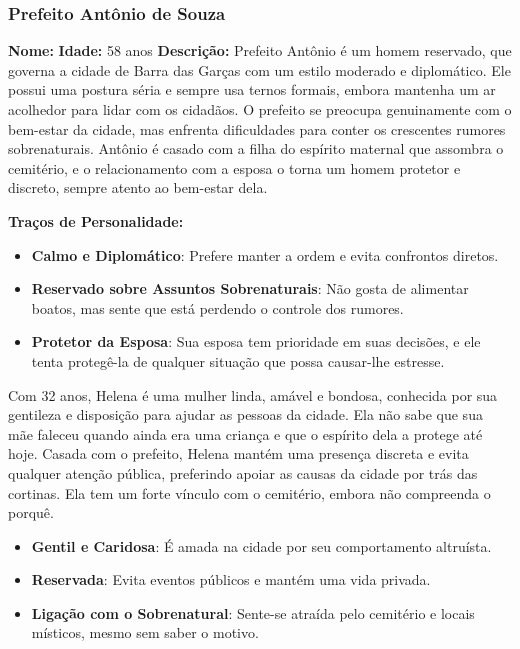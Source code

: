 \begin{personagem}
\subsubsection{Prefeito Antônio de Souza}
\textbf{Nome:} 
\textbf{Idade:} 58 anos  
\textbf{Descrição:}  
Prefeito Antônio é um homem reservado, que governa a cidade de Barra das Garças com um estilo moderado e diplomático. Ele possui uma postura séria e sempre usa ternos formais, embora mantenha um ar acolhedor para lidar com os cidadãos. O prefeito se preocupa genuinamente com o bem-estar da cidade, mas enfrenta dificuldades para conter os crescentes rumores sobrenaturais. Antônio é casado com a filha do espírito maternal que assombra o cemitério, e o relacionamento com a esposa o torna um homem protetor e discreto, sempre atento ao bem-estar dela.

\textbf{Traços de Personalidade:}
\begin{itemize}
    \item \textbf{Calmo e Diplomático}: Prefere manter a ordem e evita confrontos diretos.
    \item \textbf{Reservado sobre Assuntos Sobrenaturais}: Não gosta de alimentar boatos, mas sente que está perdendo o controle dos rumores.
    \item \textbf{Protetor da Esposa}: Sua esposa tem prioridade em suas decisões, e ele tenta protegê-la de qualquer situação que possa causar-lhe estresse.
\end{itemize}
\end{personagem}


{Com 32 anos, Helena é uma mulher linda, amável e bondosa, conhecida por sua gentileza e disposição para ajudar as pessoas da cidade. Ela não sabe que sua mãe faleceu quando ainda era uma criança e que o espírito dela a protege até hoje. Casada com o prefeito, Helena mantém uma presença discreta e evita qualquer atenção pública, preferindo apoiar as causas da cidade por trás das cortinas. Ela tem um forte vínculo com o cemitério, embora não compreenda o porquê.}
{\begin{itemize}
    \item \textbf{Gentil e Caridosa}: É amada na cidade por seu comportamento altruísta.
    \item \textbf{Reservada}: Evita eventos públicos e mantém uma vida privada.
    \item \textbf{Ligação com o Sobrenatural}: Sente-se atraída pelo cemitério e locais místicos, mesmo sem saber o motivo.
\end{itemize}}


